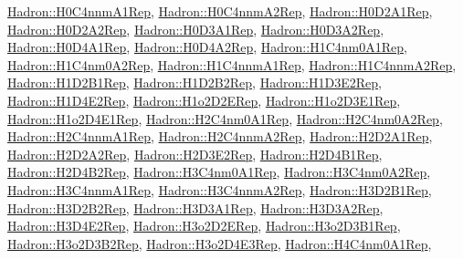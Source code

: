 \mbox{\hyperlink{structHadron_1_1H0C4nnmA1Rep}{Hadron\+::\+H0\+C4nnm\+A1\+Rep}}, \mbox{\hyperlink{structHadron_1_1H0C4nnmA2Rep}{Hadron\+::\+H0\+C4nnm\+A2\+Rep}}, \mbox{\hyperlink{structHadron_1_1H0D2A1Rep}{Hadron\+::\+H0\+D2\+A1\+Rep}}, \mbox{\hyperlink{structHadron_1_1H0D2A2Rep}{Hadron\+::\+H0\+D2\+A2\+Rep}}, \mbox{\hyperlink{structHadron_1_1H0D3A1Rep}{Hadron\+::\+H0\+D3\+A1\+Rep}}, \mbox{\hyperlink{structHadron_1_1H0D3A2Rep}{Hadron\+::\+H0\+D3\+A2\+Rep}}, \mbox{\hyperlink{structHadron_1_1H0D4A1Rep}{Hadron\+::\+H0\+D4\+A1\+Rep}}, \mbox{\hyperlink{structHadron_1_1H0D4A2Rep}{Hadron\+::\+H0\+D4\+A2\+Rep}}, \mbox{\hyperlink{structHadron_1_1H1C4nm0A1Rep}{Hadron\+::\+H1\+C4nm0\+A1\+Rep}}, \mbox{\hyperlink{structHadron_1_1H1C4nm0A2Rep}{Hadron\+::\+H1\+C4nm0\+A2\+Rep}}, \mbox{\hyperlink{structHadron_1_1H1C4nnmA1Rep}{Hadron\+::\+H1\+C4nnm\+A1\+Rep}}, \mbox{\hyperlink{structHadron_1_1H1C4nnmA2Rep}{Hadron\+::\+H1\+C4nnm\+A2\+Rep}}, \mbox{\hyperlink{structHadron_1_1H1D2B1Rep}{Hadron\+::\+H1\+D2\+B1\+Rep}}, \mbox{\hyperlink{structHadron_1_1H1D2B2Rep}{Hadron\+::\+H1\+D2\+B2\+Rep}}, \mbox{\hyperlink{structHadron_1_1H1D3E2Rep}{Hadron\+::\+H1\+D3\+E2\+Rep}}, \mbox{\hyperlink{structHadron_1_1H1D4E2Rep}{Hadron\+::\+H1\+D4\+E2\+Rep}}, \mbox{\hyperlink{structHadron_1_1H1o2D2ERep}{Hadron\+::\+H1o2\+D2\+E\+Rep}}, \mbox{\hyperlink{structHadron_1_1H1o2D3E1Rep}{Hadron\+::\+H1o2\+D3\+E1\+Rep}}, \mbox{\hyperlink{structHadron_1_1H1o2D4E1Rep}{Hadron\+::\+H1o2\+D4\+E1\+Rep}}, \mbox{\hyperlink{structHadron_1_1H2C4nm0A1Rep}{Hadron\+::\+H2\+C4nm0\+A1\+Rep}}, \mbox{\hyperlink{structHadron_1_1H2C4nm0A2Rep}{Hadron\+::\+H2\+C4nm0\+A2\+Rep}}, \mbox{\hyperlink{structHadron_1_1H2C4nnmA1Rep}{Hadron\+::\+H2\+C4nnm\+A1\+Rep}}, \mbox{\hyperlink{structHadron_1_1H2C4nnmA2Rep}{Hadron\+::\+H2\+C4nnm\+A2\+Rep}}, \mbox{\hyperlink{structHadron_1_1H2D2A1Rep}{Hadron\+::\+H2\+D2\+A1\+Rep}}, \mbox{\hyperlink{structHadron_1_1H2D2A2Rep}{Hadron\+::\+H2\+D2\+A2\+Rep}}, \mbox{\hyperlink{structHadron_1_1H2D3E2Rep}{Hadron\+::\+H2\+D3\+E2\+Rep}}, \mbox{\hyperlink{structHadron_1_1H2D4B1Rep}{Hadron\+::\+H2\+D4\+B1\+Rep}}, \mbox{\hyperlink{structHadron_1_1H2D4B2Rep}{Hadron\+::\+H2\+D4\+B2\+Rep}}, \mbox{\hyperlink{structHadron_1_1H3C4nm0A1Rep}{Hadron\+::\+H3\+C4nm0\+A1\+Rep}}, \mbox{\hyperlink{structHadron_1_1H3C4nm0A2Rep}{Hadron\+::\+H3\+C4nm0\+A2\+Rep}}, \mbox{\hyperlink{structHadron_1_1H3C4nnmA1Rep}{Hadron\+::\+H3\+C4nnm\+A1\+Rep}}, \mbox{\hyperlink{structHadron_1_1H3C4nnmA2Rep}{Hadron\+::\+H3\+C4nnm\+A2\+Rep}}, \mbox{\hyperlink{structHadron_1_1H3D2B1Rep}{Hadron\+::\+H3\+D2\+B1\+Rep}}, \mbox{\hyperlink{structHadron_1_1H3D2B2Rep}{Hadron\+::\+H3\+D2\+B2\+Rep}}, \mbox{\hyperlink{structHadron_1_1H3D3A1Rep}{Hadron\+::\+H3\+D3\+A1\+Rep}}, \mbox{\hyperlink{structHadron_1_1H3D3A2Rep}{Hadron\+::\+H3\+D3\+A2\+Rep}}, \mbox{\hyperlink{structHadron_1_1H3D4E2Rep}{Hadron\+::\+H3\+D4\+E2\+Rep}}, \mbox{\hyperlink{structHadron_1_1H3o2D2ERep}{Hadron\+::\+H3o2\+D2\+E\+Rep}}, \mbox{\hyperlink{structHadron_1_1H3o2D3B1Rep}{Hadron\+::\+H3o2\+D3\+B1\+Rep}}, \mbox{\hyperlink{structHadron_1_1H3o2D3B2Rep}{Hadron\+::\+H3o2\+D3\+B2\+Rep}}, \mbox{\hyperlink{structHadron_1_1H3o2D4E3Rep}{Hadron\+::\+H3o2\+D4\+E3\+Rep}}, \mbox{\hyperlink{structHadron_1_1H4C4nm0A1Rep}{Hadron\+::\+H4\+C4nm0\+A1\+Rep}}, 